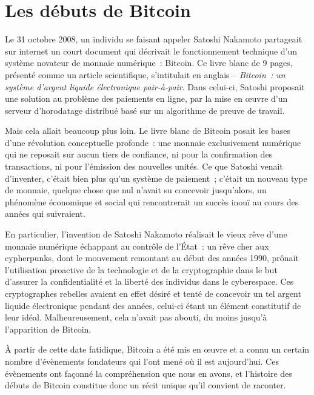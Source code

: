 
\chapter{Les débuts de Bitcoin}


Le 31 octobre 2008, un individu se faisant appeler Satoshi Nakamoto partageait sur internet un court document qui décrivait le fonctionnement technique d'un système novateur de monnaie numérique~: Bitcoin. Ce livre blanc de 9 pages, présenté comme un article scientifique, s'intitulait en anglais  -- \emph{Bitcoin~: un système d'argent liquide électronique pair-à-pair}. Dans celui-ci, Satoshi proposait une solution au problème des paiements en ligne, par la mise en œuvre d'un serveur d'horodatage distribué basé sur un algorithme de preuve de travail.

Mais cela allait beaucoup plus loin. Le livre blanc de Bitcoin posait les bases d'une révolution conceptuelle profonde~: une monnaie exclusivement numérique qui ne reposait sur aucun tiers de confiance, ni pour la confirmation des transactions, ni pour l'émission des nouvelles unités. Ce que Satoshi venait d'inventer, c'était bien plus qu'un système de paiement~; c'était un nouveau type de monnaie, quelque chose que nul n'avait su concevoir jusqu'alors, un phénomène économique et social qui rencontrerait un succès inouï au cours des années qui suivraient.

En particulier, l'invention de Satoshi Nakamoto réalisait le vieux rêve d'une monnaie numérique échappant au contrôle de l'État~: un rêve cher aux cypherpunks, dont le mouvement remontant au début des années 1990, prônait l'utilisation proactive de la technologie et de la cryptographie dans le but d'assurer la confidentialité et la liberté des individus dans le cyberespace. Ces cryptographes rebelles avaient en effet désiré et tenté de concevoir un tel argent liquide électronique pendant des années, celui-ci étant un élément constitutif de leur idéal. Malheureusement, cela n'avait pas abouti, du moins jusqu'à l'apparition de Bitcoin.

À partir de cette date fatidique, Bitcoin a été mis en œuvre et a connu un certain nombre d'évènements fondateurs qui l'ont mené où il est aujourd'hui. Ces évènements ont façonné la compréhension que nous en avons, et l'histoire des débuts de Bitcoin constitue donc un récit unique qu'il convient de raconter.

